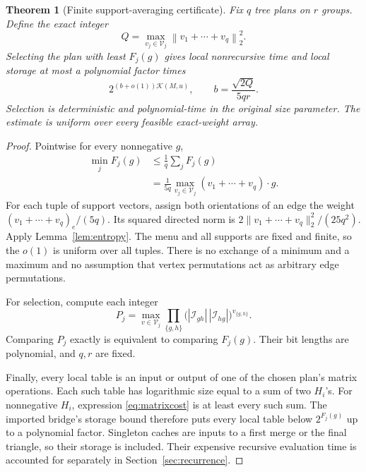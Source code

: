 \documentclass[11pt]{article}
\newtheorem{theorem}{Theorem}[section]
\theoremstyle{remark}\newtheorem{remark}[theorem]{Remark}
\newcommand{\K}{\mathcal K}
\begin{document}
\begin{theorem}[Finite support-averaging certificate]\label{thm:portfolio}
Fix $q$ tree plans on $r$ groups. Define the exact integer
\begin{equation}
 Q=\max_{v_j\in\mathcal V_j}
       \left\|v_1+\cdots+v_q\right\|_2^2.
 \label{eq:Q}
\end{equation}
Selecting the plan with least $F_j(g)$ gives local nonrecursive time and
local storage at most a polynomial factor times
\[
 2^{(b+o(1))\K(M,u)},\qquad
 b=\frac{\sqrt{2Q}}{5qr}.
\]
Selection is deterministic and polynomial-time in the original size
parameter. The estimate is uniform over every feasible exact-weight array.
\end{theorem}
\begin{proof}
Pointwise for every nonnegative $g$,
\begin{align*}
 \min_jF_j(g)
 &\le\frac1q\sum_jF_j(g)\\
 &=\frac1{5q}\max_{v_j\in\mathcal V_j}
                  (v_1+\cdots+v_q)\cdot g.
\end{align*}
For each tuple of support vectors, assign both orientations of an edge the
weight $(v_1+\cdots+v_q)_e/(5q)$. Its squared directed norm is
$2\|v_1+\cdots+v_q\|_2^2/(25q^2)$. Apply Lemma~\ref{lem:entropy}.
The menu and all supports are fixed and finite, so the $o(1)$ is uniform
over all tuples. There is no exchange of a minimum and a maximum and no
assumption that vertex permutations act as arbitrary edge permutations.

For selection, compute each integer
\[
 P_j=\max_{v\in\mathcal V_j}
       \prod_{\{g,h\}}\bigl(|\mathcal I_{gh}|\,|\mathcal I_{hg}|\bigr)^{v_{\{g,h\}}}.
\]
Comparing $P_j$ exactly is equivalent to comparing $F_j(g)$.
Their bit lengths are polynomial, and $q,r$ are fixed.

Finally, every local table is an input or output of one of the chosen
plan's matrix operations. Each such table has logarithmic size equal to a
sum of two $H_i$'s. For nonnegative $H_i$, expression
\eqref{eq:matrixcost} is at least every such sum. The imported bridge's
storage bound therefore puts every local table below $2^{F_j(g)}$ up to a
polynomial factor. Singleton caches are inputs to a first merge or the final
triangle, so their storage is included. Their expensive recursive evaluation
time is accounted for separately in Section~\ref{sec:recurrence}.
\end{proof}
\end{document}
